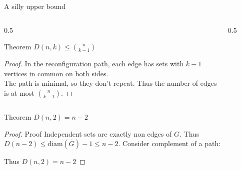\begin{frame}{A silly upper bound}
    \begin{columns}
        \begin{column}{0.5\textwidth}
            
            \begin{theorem}{Theorem}
                \(D(n,k) \leq \binom{n}{k-1}\)
            \end{theorem}
            
            \begin{proof}{}
                In the reconfiguration path, each edge has sets with \(k-1\) vertices in common on both sides. \\
                \pause
                The path is minimal, so they don't repeat. Thus the number of edges is at most \(\binom{n}{k-1}\).
            \end{proof}
            
        \end{column}
    
        \begin{column}{0.5\textwidth}
        
            \begin{figure}
                \centering
                
            \end{figure}
            
        \end{column}
    \end{columns}
\end{frame}


\begin{frame}
    \begin{theorem}{Theorem}
        \(D(n,2)=n-2\)
    \end{theorem}
    \begin{proof}{Proof}
        Independent sets are exactly non edges of \(G\). Thus \(D(n-2)\leq \mathrm{diam}(\overline{G})-1\leq n-2\). \pause Consider complement of a path:
    \begin{figure}
        \centering
            
    \end{figure}
    
    \pause
    
    Thus \(D(n,2)=n-2\)
    
    \end{proof}
\end{frame}


